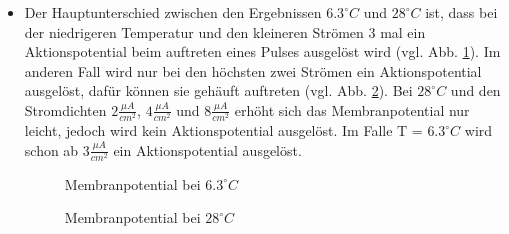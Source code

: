 \documentclass[conference]{IEEEtran}
\begin{document}
\begin{itemize}
\item Der Hauptunterschied zwischen den Ergebnissen $6.3^\circ C$ und $28^\circ C$ ist, dass bei der niedrigeren Temperatur und den kleineren Strömen 3 mal ein Aktionspotential beim auftreten eines Pulses ausgelöst wird (vgl. Abb. \ref{fig:Membranpotential6}). Im anderen Fall wird nur bei den höchsten zwei Strömen ein Aktionspotential ausgelöst, dafür können sie gehäuft auftreten (vgl. Abb. \ref{fig:Membranpotential28}). Bei $28^\circ C$ und den Stromdichten $2\frac{\mu A}{cm^2}$, $4\frac{\mu A}{cm^2}$ und $8\frac{\mu A}{cm^2}$ erhöht sich das Membranpotential nur leicht, jedoch wird kein Aktionspotential ausgelöst. Im Falle T = $6.3^\circ C$ wird schon ab $3\frac{\mu A}{cm^2}$ ein Aktionspotential ausgelöst.
\begin{figure}[h!]
  	\centering
    \scalebox{.6}{}
    \caption{Membranpotential bei $6.3^\circ C$}
    \label{fig:Membranpotential6}
\end{figure}
\begin{figure}[h!]
  	\centering
    \scalebox{.6}{}
    \caption{Membranpotential bei $28^\circ C$}
    \label{fig:Membranpotential28}
\end{figure}




\end{itemize}
\end{document}
